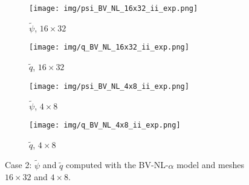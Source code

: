 \documentclass[11pt,a4paper]{article}
\begin{document}
\begin{comment}
\begin{figure}
\centering
 \begin{overpic}[width=0.19\textwidth]{img/todo2.png}
      \end{overpic}
\begin{overpic}[width=0.19\textwidth]{img/todo2.png}
      \end{overpic}
      \begin{overpic}[width=0.19\textwidth]{img/todo2.png}
      \end{overpic}
\caption{Time-averaged potential vorticity $q$ for $Ro = 0.008$ and $Re = 1000$: a) BV-$\alpha$ with mesh $16 \times 32$, b) BV-$\alpha$ with mesh $8 \times 16$, c) BV-$\alpha$ with mesh $4 \times 8$}
\label{fig:q_second_filter}
\end{figure}
\end{comment}

\begin{figure}[htb!]
\centering
\begin{subfigure}{0.193\textwidth}
         \centering
         \texttt{[image: img/psi\_BV\_NL\_16x32\_ii\_exp.png]}
         \caption{\scriptsize{$\widetilde{\psi}$, $16 \times 32$}}
     \end{subfigure}
\begin{subfigure}{0.193\textwidth}
         \centering
         \texttt{[image: img/q\_BV\_NL\_16x32\_ii\_exp.png]}
         \caption{\scriptsize{$\widetilde{q}$, $16 \times 32$}}
     \end{subfigure}
\begin{subfigure}{0.193\textwidth}
         \centering
         \texttt{[image: img/psi\_BV\_NL\_4x8\_ii\_exp.png]}
         \caption{\scriptsize{$\widetilde{\psi}$, $4 \times 8$}}
     \end{subfigure}
     \begin{subfigure}{0.193\textwidth}
         \centering
         \texttt{[image: img/q\_BV\_NL\_4x8\_ii\_exp.png]}
         \caption{\scriptsize{$\widetilde{q}$, $4 \times 8$}}
     \end{subfigure}
\caption{Case 2: $\widetilde{\psi}$ and $\widetilde{q}$ computed with the BV-NL-$\alpha$ model
and meshes $16 \times 32$ and  $4 \times 8$. }
\label{fig:BV_NL_second_filter}
\end{figure}
\end{document}
